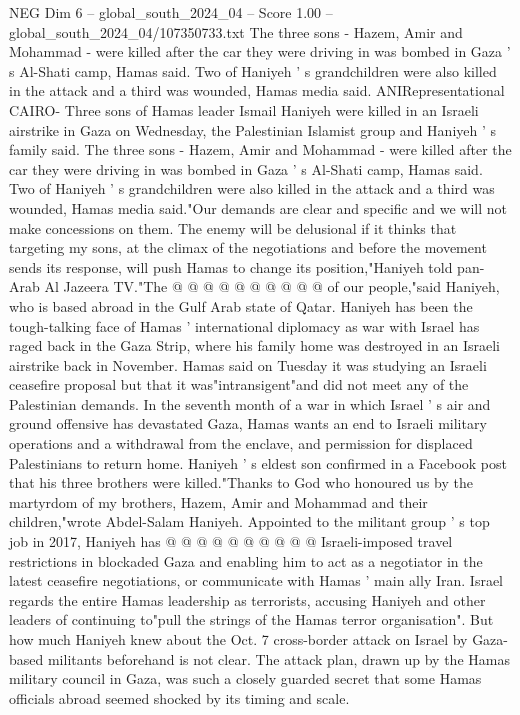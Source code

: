 \begin{textsample}{NEG Dim 6 – global\_south\_2024\_04 – Score 1.00 – global\_south\_2024\_04/107350733.txt}  \label{ex:f6_neg_360}
The three sons - Hazem, Amir and Mohammad - were killed after the car they were driving in was bombed in Gaza ' s Al-Shati camp, Hamas said.
Two of Haniyeh ' s grandchildren were also killed in the attack and a third was wounded, Hamas media said.
ANIRepresentational CAIRO- Three sons of Hamas leader Ismail Haniyeh were killed in an Israeli airstrike in Gaza on Wednesday, the Palestinian Islamist group and Haniyeh ' s family said.
The three sons - Hazem, Amir and Mohammad - were killed after the car they were driving in was bombed in Gaza ' s Al-Shati camp, Hamas said.
Two of Haniyeh ' s grandchildren were also killed in the attack and a third was wounded, Hamas media said."Our demands are clear and specific and we will not make concessions on them.
The enemy will be delusional if it thinks that targeting my sons, at the climax of the negotiations and before the movement sends its response, will push Hamas to change its position,"Haniyeh told pan-Arab Al Jazeera TV."The @ @ @ @ @ @ @ @ @ @ of our people,"said Haniyeh, who is based abroad in the Gulf Arab state of Qatar.
Haniyeh has been the tough-talking face of Hamas ' international diplomacy as war with Israel has raged back in the Gaza Strip, where his family home was destroyed in an Israeli airstrike back in November.
Hamas said on Tuesday it was studying an Israeli ceasefire proposal but that it was"intransigent"and did not meet any of the Palestinian demands.
In the seventh month of a war in which Israel ' s air and ground offensive has devastated Gaza, Hamas wants an end to Israeli military operations and a withdrawal from the enclave, and permission for displaced Palestinians to return home.
Haniyeh ' s eldest son confirmed in a Facebook post that his three brothers were killed."Thanks to God who honoured us by the martyrdom of my brothers, Hazem, Amir and Mohammad and their children,"wrote Abdel-Salam Haniyeh.
Appointed to the militant group ' s top job in 2017, Haniyeh has @ @ @ @ @ @ @ @ @ @ Israeli-imposed travel restrictions in blockaded Gaza and enabling him to act as a negotiator in the latest ceasefire negotiations, or communicate with Hamas ' main ally Iran.
Israel regards the entire Hamas leadership as terrorists, accusing Haniyeh and other leaders of continuing to"pull the strings of the Hamas terror organisation".
But how much Haniyeh knew about the Oct. 7 cross-border attack on Israel by Gaza-based militants beforehand is not clear.
The attack plan, drawn up by the Hamas military council in Gaza, was such a closely guarded secret that some Hamas officials abroad seemed shocked by its timing and scale.

\end{textsample}
